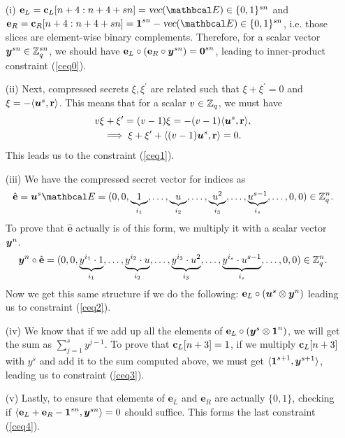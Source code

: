 \begin{enumerate}
  \item[(i)] $\textbf{e}_L = \cL[n+4: n+4+sn] = \textsl{vec}(\Emat) \in \{0,1\}^{sn}$ and $\textbf{e}_R = \cR[n+4: n+4+sn] = \textbf{1}^{sn} - \textsl{vec}(\Emat) \in \{0,1\}^{sn}$, i.e. those slices are element-wise binary complements.
  Therefore, for a scalar vector ${\boldsymbol{y}}^{sn} \in \mathbb{Z}_q^{sn}$, we should have $ \textbf{e}_L \circ (\textbf{e}_R \circ {\boldsymbol{y}}^{sn}) = \textbf{0}^{sn}$, leading to inner-product constraint (\ref{ceq0}).
  \item[(ii)] Next, compressed secrets $\xi, \xi^{\prime}$ are related such that $\xi + \xi^{\prime} = 0$ and $\xi = -\langle {\boldsymbol{u}}^s, \textbf{r}\rangle$.
  This means that for a scalar $v \in \mathbb{Z}_q$, we must have 
  \begin{gather*}
    v \xi + \xi^{\prime} = (v-1)\xi = -(v-1) \langle {\boldsymbol{u}}^s, \textbf{r}\rangle, \\
    \implies \xi + \xi^{\prime} + \langle (v-1){\boldsymbol{u}}^s, \textbf{r}\rangle = 0.
  \end{gather*}
  This leads us to the constraint (\ref{ceq1}).

  \item[(iii)] We have the compressed secret vector for indices as
  \begin{equation*}
    \hat{\textbf{e}} = \vecnb{u}^s \Emat = (0, 0, \underbrace{1}_{i_1}, \dots, \underbrace{u}_{i_2}, \dots, \underbrace{u^2}_{i_3}, \dots, \underbrace{u^{s-1}}_{i_s}, \dots, 0, 0) \in \Z_q^n.
  \end{equation*} 
  To prove that $\hat{\textbf{e}}$ actually is of this form, we multiply it with a scalar vector ${\boldsymbol{y}}^{n}$.
  \begin{equation*}
    {\boldsymbol{y}}^n \circ \hat{\textbf{e}} = (0, 0, \underbrace{y^{i_1} \cdot 1}_{i_1}, \dots, \underbrace{y^{i_2} \cdot u}_{i_2}, \dots, \underbrace{y^{i_3} \cdot u^2}_{i_3}, \dots, \underbrace{y^{i_s} \cdot u^{s-1}}_{i_s}, \dots, 0, 0) \in \mathbb{Z}_q^n.
  \end{equation*} 
  Now we get this same structure if we do the following: $\textbf{e}_L \circ ({\boldsymbol{u}}^s \otimes {\boldsymbol{y}}^n)$ leading us to constraint (\ref{ceq2}).

  \item[(iv)] We know that if we add up all the elements of $\textbf{e}_L \circ ({\boldsymbol{y}}^s \otimes \textbf{1}^n)$, we will get the sum as $\sum_{j=1}^s y^{j-1}$.
  To prove that $\textbf{c}_L[n+3] = 1$, if we multiply $\textbf{c}_L[n+3]$ with $y^s$ and add it to the sum computed above, we must get $\langle \textbf{1}^{s+1},{\boldsymbol{y}}^{s+1} \rangle$, leading us to constraint (\ref{ceq3}).
  
  \item[(v)] Lastly, to ensure that elements of $\textbf{e}_L$ and $\textbf{e}_R$ are actually $\{0,1\}$, checking if $\langle \textbf{e}_L + \textbf{e}_R - {\boldsymbol{1}}^{sn}, {\boldsymbol{y}}^{sn} \rangle = 0$ should suffice.
  This forms the last constraint (\ref{ceq4}). 
\end{enumerate}
